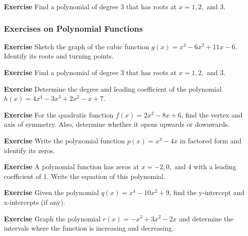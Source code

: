\documentclass[a4paper,12pt]{book}
\newenvironment{exercise}[1][]
  {\par\medskip\noindent\textbf{Exercise #1} \rmfamily}
  {\medskip}
\begin{document}
\begin{exercise}
Find a polynomial of degree 3 that has roots at \( x = 1, 2, \) and \( 3 \).
\end{exercise}

\subsubsection*{Exercises on Polynomial Functions}

\begin{exercise}
Sketch the graph of the cubic function \( g(x) = x^3 - 6x^2 + 11x - 6 \). Identify its roots and turning points.
\end{exercise}

\begin{exercise}
Find a polynomial of degree 3 that has roots at \( x = 1, 2, \) and \( 3 \).
\end{exercise}

\begin{exercise}
Determine the degree and leading coefficient of the polynomial \( h(x) = 4x^4 - 3x^3 + 2x^2 - x + 7 \).
\end{exercise}

\begin{exercise}
For the quadratic function \( f(x) = 2x^2 - 8x + 6 \), find the vertex and axis of symmetry. Also, determine whether it opens upwards or downwards.
\end{exercise}

\begin{exercise}
Write the polynomial function \( p(x) = x^3 - 4x \) in factored form and identify its zeros.
\end{exercise}

\begin{exercise}
A polynomial function has zeros at \( x = -2, 0, \) and \( 4 \) with a leading coefficient of 1. Write the equation of this polynomial.
\end{exercise}

\begin{exercise}
Given the polynomial \( q(x) = x^4 - 10x^2 + 9 \), find the y-intercept and x-intercepts (if any).
\end{exercise}

\begin{exercise}
Graph the polynomial \( r(x) = -x^3 + 3x^2 - 2x \) and determine the intervals where the function is increasing and decreasing.
\end{exercise}
\end{document}
